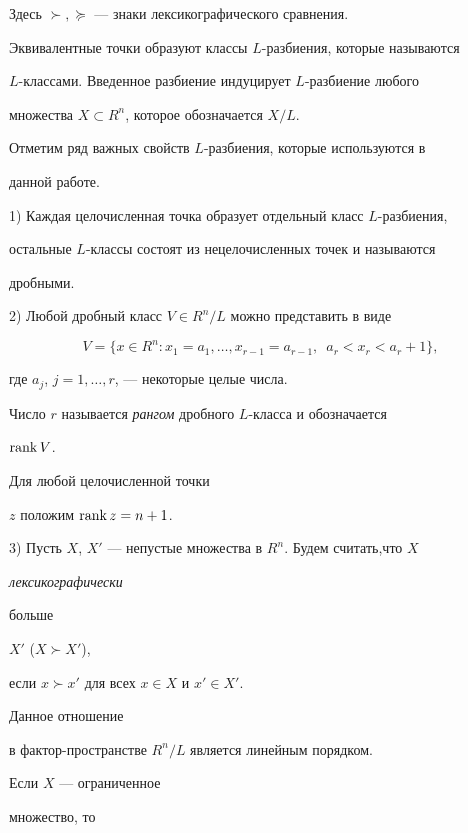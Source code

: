 Здесь $ \succ, \succeq$ --- знаки лексикографического сравнения.


Эквивалентные точки образуют классы $L$-разбиения, которые называются


$L$-классами. Введенное разбиение индуцирует $L$-разбиение  любого


множества $X \subset R^{n}$, которое обозначается $X/L$.


Отметим ряд важных свойств $L$-разбиения, которые используются в


данной работе.








1) Каждая целочисленная точка образует отдельный  класс $L$-разбиения,


остальные $L$-клас\-сы состоят из нецелочисленных точек и называются 


дробными.





2) Любой дробный класс $V \in R^{n}/L$ можно представить в виде


$$


V= \{ x \in R^{n}:x_{1}=a_{1}, \dotsc,x_{r-1}=


a_{r-1},\ \; a_{r}<x_{r}<a_{r}+1 \}, 


$$


где $a_{j}$, $j=1, \dotsc,r$, --- некоторые целые числа.


Число $r$ называется {\it рангом} дробного $L$-класса и обозначается 


$\operatorname{rank} V$.


Для любой целочисленной точки


$z$ положим $\operatorname{rank} z = n+1$.





3) Пусть $X$, $X'$ --- непустые множества в $R^{n}$. Будем считать,что $X$


{\it лексикографически


больше} $X'$ ($X \succ X'$),


если $x \succ x'$ для всех $x \in X$ и $x' \in X'$.


Данное отношение


в фактор-пространстве $R^{n}/L$ является линейным порядком.


Если $X$ --- ограниченное


множество, то


$$


